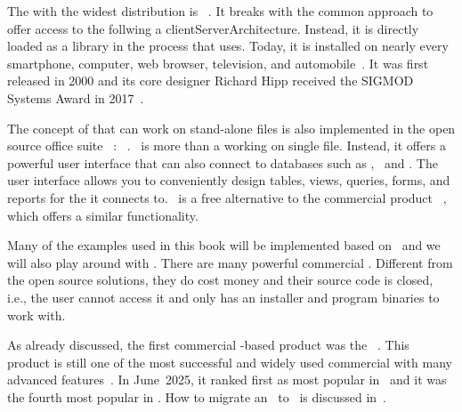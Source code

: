 The   with the widest distribution is \sqlite~\cite{WB2019RHSOOS,GPBHKP2022SPPAF,C20245YOQ,HWACIS:HO2023WKUOS}.
It breaks with the common approach to offer access to the  follwing a \gls{clientServerArchitecture}.
Instead, it is directly loaded as a library in the process that uses.
Today, it is installed on nearly every smartphone, computer, web browser, television, and automobile~\cite{WB2019RHSOOS,GPBHKP2022SPPAF,C20245YOQ}.
It was first released in 2000 and its core designer Richard Hipp received the SIGMOD Systems Award in 2017~\cite{C20245YOQ}.

The concept of  that can work on stand-alone files is also implemented in the open source office suite \libreoffice~\cite{DF2024LTDF,GL2012LTSOOSSCBAFACSOL,S2022L7PFEUU}: \libreofficeBase~\cite{FNFHWSKLSSGLFRSRPLJG2022BG7R1BOL7C,S2022L7PFEUU}.
\libreofficeBase\ is more than a  working on single file.
Instead, it offers a powerful user interface that can also connect to databases such as \mysql, \mariadb\ and \postgresql.
The user interface allows you to conveniently design tables, views, queries, forms, and reports for the  it connects to.
\libreofficeBase\ is a free alternative to the commercial product \microsoftAccess~\cite{SSI2023MA2BTA,B2020HOMA2,UC2021AFD}, which offers a similar functionality.

Many of the examples used in this book will be implemented based on \postgresql\ and we will also play around with \libreofficeBase.%
%
\endhsection%
%
%
%
There are many powerful commercial .
Different from the open source solutions, they do cost money and their source code is closed, i.e., the user cannot access it and only has an installer and program binaries to work with.

As already discussed, the first commercial -based product was the \oracleDB~\cite{C20245YOQ,O2007OTHTMIMIOHWCFTPWMIH}.
This product is still one of the most successful and widely used commercial  with many advanced features~\cite{BBDDSY2011ADOODM,KK2021EODATASFHPAP}.
In June~2025, it ranked first as most popular  in~\cite{RS2025DERORD} and it was the fourth most popular  in \cite{PMPVEPWGSMB2025ATAODMSTTHOOSP}.
How to migrate an \oracleDB\ to \postgresql\ is discussed in~\cite{KO2023DMFOTP}.

